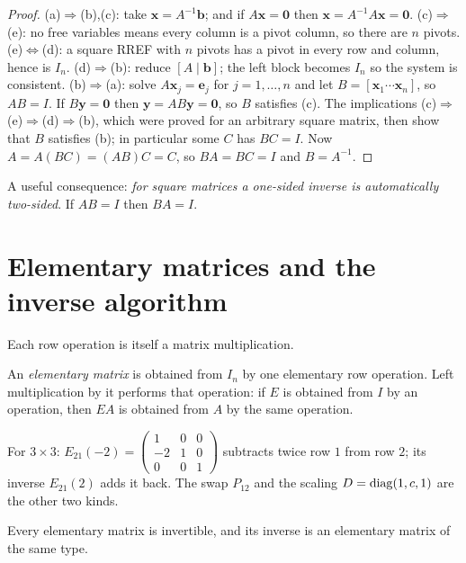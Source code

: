 \begin{proof}
(a)$\Rightarrow$(b),(c): take $\mathbf{x}=A^{-1}\mathbf{b}$; and if $A\mathbf{x}=\mathbf{0}$ then $\mathbf{x}=A^{-1}A\mathbf{x}=\mathbf{0}$. (c)$\Rightarrow$(e): no free variables means every column is a pivot column, so there are $n$ pivots. (e)$\Leftrightarrow$(d): a square RREF with $n$ pivots has a pivot in every row and column, hence is $I_n$. (d)$\Rightarrow$(b): reduce $[A\mid\mathbf{b}]$; the left block becomes $I_n$ so the system is consistent. (b)$\Rightarrow$(a): solve $A\mathbf{x}_j=\mathbf{e}_j$ for $j=1,\dots,n$ and let $B=[\mathbf{x}_1\cdots\mathbf{x}_n]$, so $AB=I$. If $B\mathbf{y}=\mathbf{0}$ then $\mathbf{y}=AB\mathbf{y}=\mathbf{0}$, so $B$ satisfies (c). The implications (c)$\Rightarrow$(e)$\Rightarrow$(d)$\Rightarrow$(b), which were proved for an arbitrary square matrix, then show that $B$ satisfies (b); in particular some $C$ has $BC=I$. Now $A=A(BC)=(AB)C=C$, so $BA=BC=I$ and $B=A^{-1}$.
\end{proof}

A useful consequence: \emph{for square matrices a one-sided inverse is automatically two-sided}. If $AB=I$ then $BA=I$.

\section{Elementary matrices and the inverse algorithm}

Each row operation is itself a matrix multiplication.

\begin{definition}
An \emph{elementary matrix} is obtained from $I_n$ by one elementary row operation. Left multiplication by it performs that operation: if $E$ is obtained from $I$ by an operation, then $EA$ is obtained from $A$ by the same operation.
\end{definition}

\begin{example}
For $3\times 3$: $E_{21}(-2)=\begin{pmatrix}1&0&0\\-2&1&0\\0&0&1\end{pmatrix}$ subtracts twice row $1$ from row $2$; its inverse $E_{21}(2)$ adds it back. The swap $P_{12}$ and the scaling $D=\operatorname{diag}(1,c,1)$ are the other two kinds.
\end{example}

\begin{theorem}
Every elementary matrix is invertible, and its inverse is an elementary matrix of the same type.
\end{theorem}

